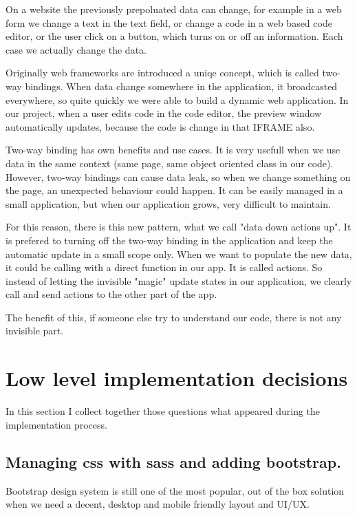 \documentclass[12pt, a4paper, oneside, openright, medskipamount]{report}
\begin{document}
On a website the previously prepoluated data can change, for example in a web form we change a text in the text field, or change a code in a web based code editor, or the user click on a button, which turns on or off an information. Each case we actually change the data.

Originally web frameworks are introduced a uniqe concept, which is called two-way bindings. When data change somewhere in the application, it broadcasted everywhere, so quite quickly we were able to build a dynamic web application. In our project, when a user edits code in the code editor, the preview window automatically updates, because the code is change in that IFRAME also.

Two-way binding has own benefits and use cases. It is very usefull when we use data in the same context (same page, same object oriented class in our code). However, two-way bindings can cause data leak, so when we change something on the page, an unexpected behaviour could happen. It can be easily managed in a small application, but when our application grows, very difficult to maintain.

For this reason, there is this new pattern, what we call "data down actions up". It is prefered to turning off the two-way binding in the application and keep the automatic update in a small scope only. When we want to populate the new data, it could be calling with a direct function in our app. It is called actions. So instead of letting the invisible "magic" update states in our application, we clearly call and send actions to the other part of the app.

The benefit of this, if someone else try to understand our code, there is not any invisible part.

\section{Low level implementation decisions}

In this section I collect together those questions what appeared during the implementation process.

\subsection{Managing css with sass and adding bootstrap.}

Bootstrap\cite{bootstrap} design system is still one of the most popular, out of the box solution when we need a decent, desktop and mobile friendly layout and UI/UX.
\end{document}
